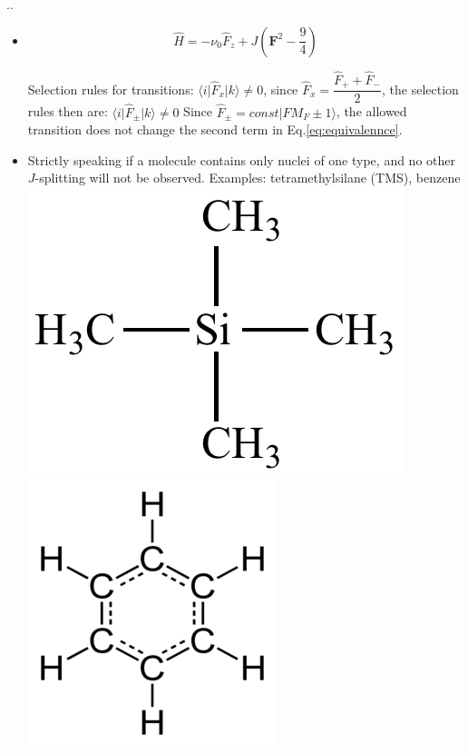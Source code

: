 \documentclass{beamer}
\begin{document}
\begin{frame}{\thesection.\thesubsection. \insertsubsection}

\begin{itemize}[<+>]
	\item
	
	\begin{equation}\label{eq:equivalennce}
	\hat{H} = - \nu_0 \hat{F}_{z} + J (\bm{F}^2 - \dfrac{9}{4} )    
	\end{equation}
	
	Selection rules for transitions: $\langle i \vert  \hat{F}_x \vert k \rangle \neq 0$, since $\hat{F}_x = \dfrac{\hat{F}_{+} + \hat{F}_{-}}{2}$, the selection rules then are: $\langle i \vert  \hat{F}_{\pm} \vert k \rangle \neq 0$
	Since $\hat{F}_{\pm} = const \vert F M_F\pm1 \rangle$, the allowed transition does not change the second term in Eq.\ref{eq:equivalennce}.
	
	\item
	Strictly speaking if a molecule contains only nuclei of one type, and no other $J$-splitting will not be observed. Examples: tetramethylsilane (TMS), benzene
    \includegraphics[scale = 0.5]{tetramethylsilane.png}
    \includegraphics[scale = 0.15]{Benzene-2D-flat.png}
\end{itemize}
\end{frame}
\end{document}
